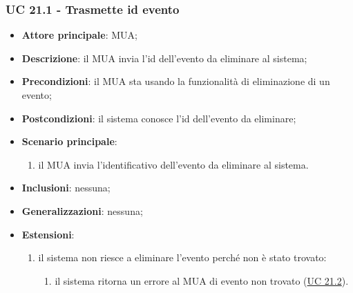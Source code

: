 \subsubsection{UC 21.1 - Trasmette id evento} \label{sec:UC21.1}
    \begin{itemize}
        \item \textbf{Attore principale}: MUA;
        \item \textbf{Descrizione}:  il MUA invia l'id dell'evento da eliminare al sistema;
        \item \textbf{Precondizioni}: il MUA sta usando la funzionalità di eliminazione di un evento;
        \item \textbf{Postcondizioni}:  il sistema conosce l'id dell'evento da eliminare;
        \item \textbf{Scenario principale}:
            \begin{enumerate}
                \item il MUA invia l'identificativo dell'evento da eliminare al sistema.
            \end{enumerate}
        \item \textbf{Inclusioni}: nessuna;
        \item \textbf{Generalizzazioni}: nessuna;
        \item \textbf{Estensioni}:
            \begin{enumerate}[label=\alph*.]
                \item il sistema non riesce a eliminare l'evento perché non è stato trovato:
                \begin{enumerate}[label=\arabic*.]
                    \item il sistema ritorna un errore al MUA di evento non trovato (\hyperref[sec:UC21.2]{UC 21.2}).
                \end{enumerate}
            \end{enumerate}
    \end{itemize}


